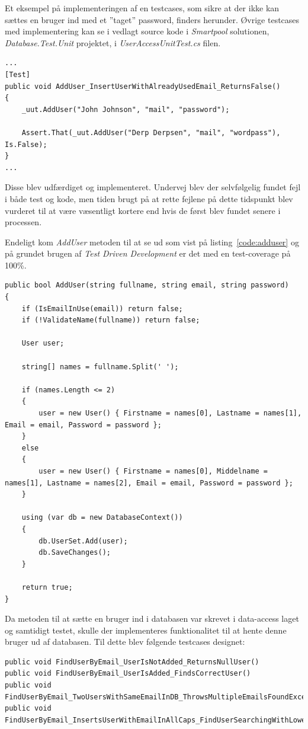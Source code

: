 Et eksempel på implementeringen af en testcases, som sikre at der ikke kan sættes en bruger ind med et ''taget'' password, finders herunder. Øvrige testcases med implementering kan se i vedlagt source kode i \textit{Smartpool} solutionen, \textit{Database.Test.Unit} projektet, i \textit{UserAccessUnitTest.cs} filen.

\begin{lstlisting}
...
[Test]
public void AddUser_InsertUserWithAlreadyUsedEmail_ReturnsFalse()
{
	_uut.AddUser("John Johnson", "mail", "password");
	
	Assert.That(_uut.AddUser("Derp Derpsen", "mail", "wordpass"), Is.False);
}
...
\end{lstlisting}

Disse blev udfærdiget og implementeret. Undervej blev der selvfølgelig fundet fejl i både test og kode, men tiden brugt på at rette fejlene på dette tidspunkt blev vurderet til at være væsentligt kortere end hvis de først blev fundet senere i processen. 

Endeligt kom \textit{AddUser} metoden til at se ud som vist på listing~\ref{code:adduser} og på grundet brugen af \textit{Test Driven Development} er det med en test-coverage på 100\%.

\begin{lstlisting}[caption=\textit{AddUser} klassen,label=code:adduser]
public bool AddUser(string fullname, string email, string password)
{
	if (IsEmailInUse(email)) return false;
	if (!ValidateName(fullname)) return false;
	
	User user;
	
	string[] names = fullname.Split(' ');
	
	if (names.Length <= 2)
	{
		user = new User() { Firstname = names[0], Lastname = names[1], Email = email, Password = password };
	}
	else
	{
		user = new User() { Firstname = names[0], Middelname = names[1], Lastname = names[2], Email = email, Password = password };
	}
	
	using (var db = new DatabaseContext())
	{
		db.UserSet.Add(user);
		db.SaveChanges();
	}
	
	return true;
}
\end{lstlisting}

Da metoden til at sætte en bruger ind i databasen var skrevet i data-access laget og samtidigt testet, skulle der implementeres funktionalitet til at hente denne bruger ud af databasen. Til dette blev følgende testcases designet:

\begin{lstlisting}[caption=Testcases til \textit{FindUserByEmail} metoden.,label=code:finduserbyemailtestcases]
public void FindUserByEmail_UserIsNotAdded_ReturnsNullUser()
public void FindUserByEmail_UserIsAdded_FindsCorrectUser()
public void FindUserByEmail_TwoUsersWithSameEmailInDB_ThrowsMultipleEmailsFoundException()
public void FindUserByEmail_InsertsUserWithEmailInAllCaps_FindUserSearchingWithLowerCaps()
\end{lstlisting}

